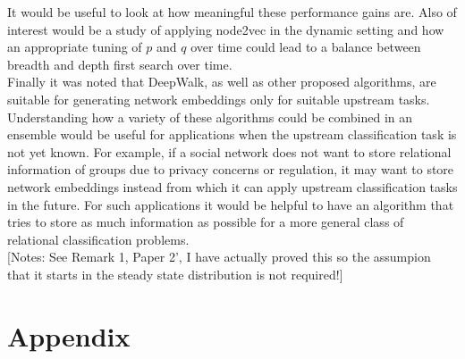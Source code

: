 \documentclass[a4paper]{article}
\begin{document}
It would be useful to look at how meaningful these performance gains are. Also of interest would be a study of applying node2vec in the dynamic setting and how an appropriate tuning of $p$ and $q$ over time could lead to a balance between breadth and depth first search over time.\\
Finally it was noted that DeepWalk, as well as other proposed algorithms, are suitable for generating network embeddings only for suitable upstream tasks. Understanding how a variety of these algorithms could be combined in an ensemble would be useful for applications when the upstream classification task is not yet known. For example, if a social network
does not want to store relational information of groups due to privacy concerns or regulation, it may want to store network embeddings instead from which it can apply upstream classification tasks in the future. For such applications it would be helpful to have an algorithm that tries to store as much information as possible for a more general class of relational classification problems.\\

[Notes: See Remark 1, Paper 2', I have actually proved this so the assumpion that it starts in the steady state distribution is not required!]
\section{Appendix}
\label{sec:appendix}
\end{document}
